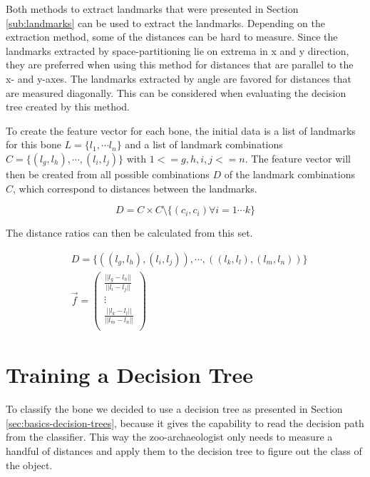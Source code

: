 \documentclass[pdftex,12pt,a4paper]{report}
\begin{document}
Both methods to extract landmarks that were presented in Section \ref{sub:landmarks} can be used to extract the landmarks. Depending on the extraction method, some of the distances can be hard to measure. Since the landmarks extracted by space-partitioning lie on extrema in x and y direction, they are preferred when using this method for distances that are parallel to the x- and y-axes. The landmarks extracted by angle are favored for distances that are measured diagonally. This can be considered when evaluating the decision tree created by this method.

To create the feature vector for each bone, the initial data is a list of landmarks for this bone $L = \{ l_1, \cdots l_n \}$ and a list of landmark combinations $C = \{ (l_g, l_h), \cdots, (l_i, l_j) \}$ with $1 <= g,h,i,j <= n$. The feature vector will then be created from all possible combinations $D$ of the landmark combinations $C$, which correspond to distances between the landmarks.

\begin{equation}
D = C \times C \setminus \{ (c_i, c_i) \forall i = 1 \cdots k \}
\end{equation}

The distance ratios can then be calculated from this set.

\begin{equation}
\begin{split}
& D = \{ ((l_g, l_h), (l_i, l_j)), \cdots, ((l_k, l_l), (l_m, l_n)) \} \\
& \vec{f} = \left( \begin{array}{c}
\frac{||l_g - l_h||}{||l_i - l_j||} \\
\vdots \\
\frac{||l_k - l_l||}{||l_m - l_n||} \\
\end{array} \right)
\end{split}
\end{equation}

\section{Training a Decision Tree}

To classify the bone we decided to use a decision tree as presented in Section \ref{sec:basics-decision-trees}, because it gives the capability to read the decision path from the classifier. This way the zoo-archaeologist only needs to measure a handful of distances and apply them to the decision tree to figure out the class of the object.
\end{document}
